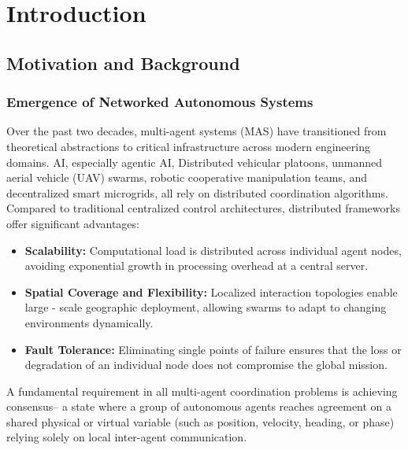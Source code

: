 \chapter{Introduction}\label{ch:intro}
\section{Motivation and Background}
\subsection{Emergence of Networked Autonomous Systems}
Over the past two decades, multi-agent systems (MAS) have transitioned from theoretical abstractions to critical infrastructure across modern engineering domains. AI, especially agentic AI, Distributed vehicular platoons, unmanned aerial vehicle (UAV) swarms, robotic cooperative manipulation teams, and decentralized smart microgrids, all rely on distributed coordination algorithms. Compared to traditional centralized control architectures, distributed frameworks offer significant advantages:
\begin{itemize}
    \item \textbf{Scalability:} Computational load is distributed across individual agent nodes, avoiding exponential growth in processing overhead at a central server. 
    \item \textbf{Spatial Coverage and Flexibility:} Localized interaction topologies enable large - scale geographic deployment, allowing swarms to adapt to changing environments dynamically.
    \item \textbf{Fault Tolerance:} Eliminating single points of failure ensures that the loss or degradation of an individual node does not compromise the global mission.
\end{itemize}
A fundamental requirement in all multi-agent coordination problems is achieving consensus-- a state where a group of autonomous agents reaches agreement on a shared physical or virtual variable (such as position, velocity, heading, or phase) relying solely on local inter-agent communication.

